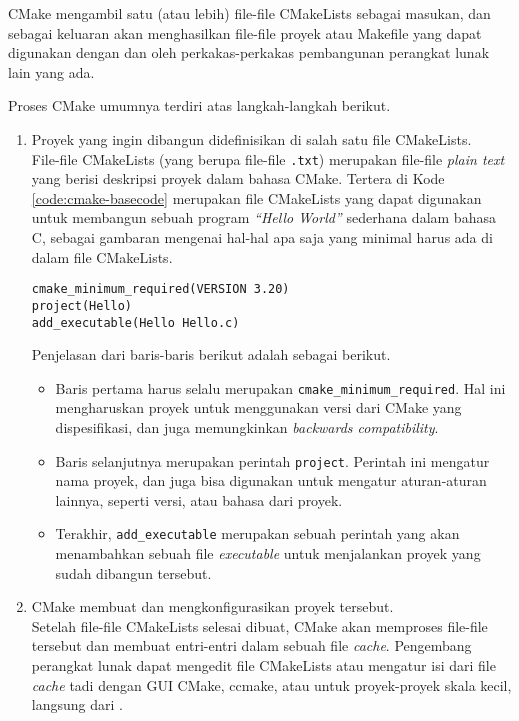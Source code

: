 CMake mengambil satu (atau lebih) file-file CMakeLists sebagai masukan, dan sebagai keluaran akan menghasilkan file-file proyek atau Makefile yang dapat digunakan dengan dan oleh perkakas-perkakas pembangunan perangkat lunak lain yang ada.

Proses CMake umumnya terdiri atas langkah-langkah berikut.

\begin{enumerate}
	\item Proyek yang ingin dibangun didefinisikan di salah satu file CMakeLists.\\
	File-file CMakeLists (yang berupa file-file \verb|.txt|) merupakan file-file \textit{plain text} yang berisi deskripsi proyek dalam bahasa CMake. Tertera di Kode \ref{code:cmake-basecode} merupakan file CMakeLists yang dapat digunakan untuk membangun sebuah program \textit{``Hello World''} sederhana dalam bahasa C, sebagai gambaran mengenai hal-hal apa saja yang minimal harus ada di dalam file CMakeLists.

	\begin{lstlisting}[caption=Kode utama operasional CMake, label=code:cmake-basecode]
cmake_minimum_required(VERSION 3.20)
project(Hello)
add_executable(Hello Hello.c)
	\end{lstlisting}
	
	Penjelasan dari baris-baris berikut adalah sebagai berikut.
	
	\begin{itemize}
		\item Baris pertama harus selalu merupakan \verb|cmake_minimum_required|. Hal ini mengharuskan proyek untuk menggunakan versi dari CMake yang dispesifikasi, dan juga memungkinkan \textit{backwards compatibility}.
		\item Baris selanjutnya merupakan perintah \verb|project|. Perintah ini mengatur nama proyek, dan juga bisa digunakan untuk mengatur aturan-aturan lainnya, seperti versi, atau bahasa dari proyek.
		\item Terakhir, \verb|add_executable| merupakan sebuah perintah yang akan menambahkan sebuah file \textit{executable} untuk menjalankan proyek yang sudah dibangun tersebut.
	\end{itemize}
	\item CMake membuat dan mengkonfigurasikan proyek tersebut.\\
	Setelah file-file CMakeLists selesai dibuat, CMake akan memproses file-file tersebut dan membuat entri-entri dalam sebuah file \textit{cache}. Pengembang perangkat lunak dapat mengedit file CMakeLists atau mengatur isi dari file \textit{cache} tadi dengan GUI CMake, ccmake, atau untuk proyek-proyek skala kecil, langsung dari \cl.
	

\end{enumerate}
